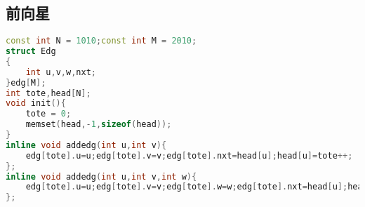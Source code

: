 \subsection{前向星}
		\begin{lstlisting}[language=c++]
const int N = 1010;const int M = 2010;
struct Edg
{
	int u,v,w,nxt; 
}edg[M];	
int tote,head[N];
void init(){
	tote = 0;
	memset(head,-1,sizeof(head));
}
inline void addedg(int u,int v){
	edg[tote].u=u;edg[tote].v=v;edg[tote].nxt=head[u];head[u]=tote++;
};
inline void addedg(int u,int v,int w){
	edg[tote].u=u;edg[tote].v=v;edg[tote].w=w;edg[tote].nxt=head[u];head[u]=tote++;
};
	\end{lstlisting}